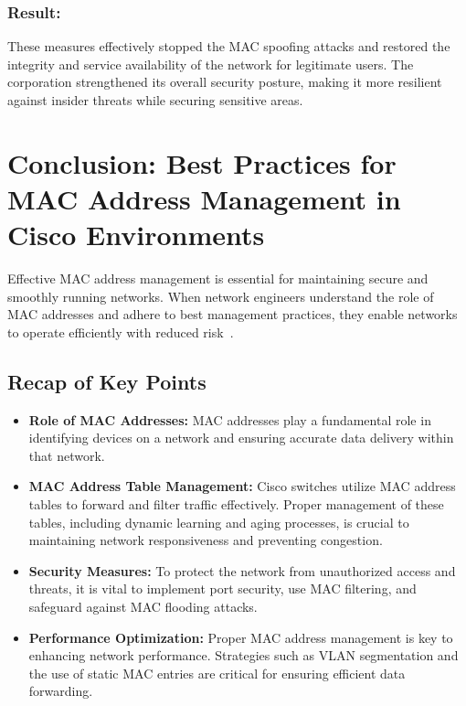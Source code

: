 \documentclass[11pt,a4paper]{article}
\begin{document}
\subsubsection*{Result:}
These measures effectively stopped the MAC spoofing attacks and restored the integrity and service availability of the network for legitimate users. The corporation strengthened its overall security posture, making it more resilient against insider threats while securing sensitive areas.

\section*{Conclusion: Best Practices for MAC Address Management in Cisco Environments}

Effective MAC address management is essential for maintaining secure and smoothly running networks. When network engineers understand the role of MAC addresses and adhere to best management practices, they enable networks to operate efficiently with reduced risk~\cite{Conclusion}.

\subsection*{Recap of Key Points}
    \begin{itemize}
        \item \textbf{Role of MAC Addresses:} MAC addresses play a fundamental role in identifying devices on a network and ensuring accurate data delivery within that network.
        \item \textbf{MAC Address Table Management:} Cisco switches utilize MAC address tables to forward and filter traffic effectively. Proper management of these tables, including dynamic learning and aging processes, is crucial to maintaining network responsiveness and preventing congestion.
        \item \textbf{Security Measures:} To protect the network from unauthorized access and threats, it is vital to implement port security, use MAC filtering, and safeguard against MAC flooding attacks.
        \item \textbf{Performance Optimization:} Proper MAC address management is key to enhancing network performance. Strategies such as VLAN segmentation and the use of static MAC entries are critical for ensuring efficient data forwarding.
    \end{itemize}
\end{document}

